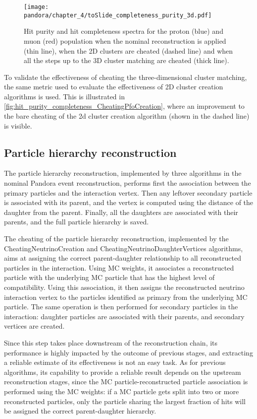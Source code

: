 \begin{figure}
    \centering
    \texttt{[image: pandora/chapter\_4/toSlide\_completeness\_purity\_3d.pdf]}
    \caption[Hit purity and completeness with CheatingPfoCreation algorithm]{Hit purity and hit completeness spectra for the proton (blue) and muon (red) population when the nominal reconstruction is applied (thin line), when the 2D clusters are cheated (dashed line) and when all the steps up to the 3D cluster matching are cheated (thick line).}
    \label{fig:hit_purity_completeness_CheatingPfoCreation}
\end{figure}

To validate the effectiveness of cheating the three-dimensional cluster matching, the same metric used to evaluate the effectiveness of 2D cluster creation algorithms is used. This is illustrated in \autoref{fig:hit_purity_completeness_CheatingPfoCreation}, where an improvement to the bare cheating of the 2d cluster creation algorithm (shown in the dashed line) is visible. 

\subsection{Particle hierarchy reconstruction} 

The particle hierarchy reconstruction, implemented by three algorithms in the nominal Pandora event reconstruction, performs first the association between the primary particles and the interaction vertex. Then any leftover secondary particle is associated with its parent, and the vertex is computed using the distance of the daughter from the parent. Finally, all the daughters are associated with their parents, and the full particle hierarchy is saved.

The cheating of the particle hierarchy reconstruction, implemented by the CheatingNeutrinoCreation and CheatingNeutrinoDaughterVertices algorithms, aims at assigning the correct parent-daughter relationship to all reconstructed particles in the interaction. Using MC weights, it associates a reconstructed particle with the underlying MC particle that has the highest level of compatibility. Using this association, it then assigns the reconstructed neutrino interaction vertex to the particles identified as primary from the underlying MC particle. The same operation is then performed for secondary particles in the interaction: daughter particles are associated with their parents, and secondary vertices are created. 

Since this step takes place downstream of the reconstruction chain, its performance is highly impacted by the outcome of previous stages, and extracting a reliable estimate of its effectiveness is not an easy task. As for previous algorithms, its capability to provide a reliable result depends on the upstream reconstruction stages, since the MC particle-reconstructed particle association is performed using the MC weights: if a MC particle gets split into two or more reconstructed particles, only the particle sharing the largest fraction of hits will be assigned the correct parent-daughter hierarchy.

